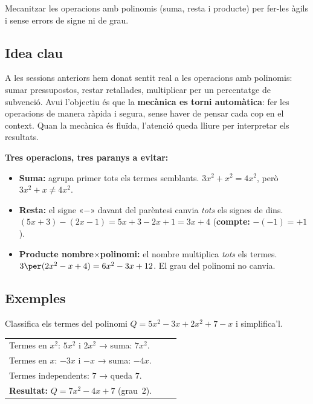 %
{Mecanitzar les operacions amb polinomis (suma, resta i producte) per fer-les
àgils i sense errors de signe ni de grau.}

\subsection{Idea clau}

A les sessions anteriors hem donat sentit real a les operacions amb polinomis:
sumar pressupostos, restar retallades, multiplicar per un percentatge de
subvenció. Avui l'objectiu és que la \textbf{mecànica es torni automàtica}:
fer les operacions de manera ràpida i segura, sense haver de pensar cada cop
en el context. Quan la mecànica és fluïda, l'atenció queda lliure per
interpretar els resultats.

\begin{idea}
\textbf{Tres operacions, tres paranys a evitar:}
\begin{itemize}[leftmargin=1.4em, itemsep=3pt]
  \item \textbf{Suma:} agrupa primer tots els termes semblants.
        $3x^2 + x^2 = 4x^2$, però $3x^2 + x \neq 4x^2$.
  \item \textbf{Resta:} el signe «$-$» davant del parèntesi canvia
        \emph{tots} els signes de dins.
        $(5x+3)-(2x-1) = 5x+3-2x+1 = 3x+4$
        (\textbf{compte:} $-(-1) = +1$).
  \item \textbf{Producte nombre$\times$polinomi:} el nombre multiplica
        \emph{tots} els termes. $3\per(2x^2-x+4) = 6x^2-3x+12$.
        El grau del polinomi no canvia.
\end{itemize}
\end{idea}

\subsection{Exemples}

\begin{exemple}
Classifica els termes del polinomi $Q = 5x^2 - 3x + 2x^2 + 7 - x$ i
simplifica'l.

\medskip
\begin{tabular}{@{}p{0.88\linewidth}@{}}
Termes en $x^2$: $5x^2$ i $2x^2$ → suma: $7x^2$. \\[3pt]
Termes en $x$: $-3x$ i $-x$ → suma: $-4x$. \\[3pt]
Termes independents: $7$ → queda $7$. \\[3pt]
\textbf{Resultat:} $Q = 7x^2 - 4x + 7$ \quad (grau~2).
\end{tabular}
\end{exemple}

